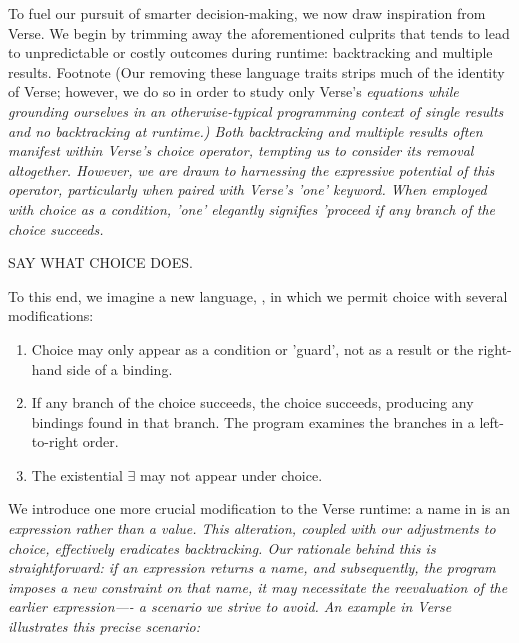 \documentclass[manuscript,screen,review, 12pt]{acmart}
\begin{document}
        
        To fuel our pursuit of smarter decision-making, we now draw inspiration
        from Verse. We begin by trimming away the aforementioned culprits that
        tends to lead to unpredictable or costly outcomes during runtime:
        backtracking and multiple results. Footnote (Our removing these language
        traits strips much of the identity of Verse; however, we do so in order
        to study only Verse's \it{equations} while grounding ourselves in an
        otherwise-typical programming context of single results and no
        backtracking at runtime.) Both backtracking and multiple results often
        manifest within Verse's choice operator, tempting us to consider its
        removal altogether. However, we are drawn to harnessing the expressive
        potential of this operator, particularly when paired with Verse's 'one'
        keyword. When employed with choice as a condition, 'one' elegantly
        signifies 'proceed if any branch of the choice succeeds. 
        
        
        SAY WHAT CHOICE DOES. 

        To this end, we imagine a new language, \VMinus, in which we permit
        choice with several modifications:

        \begin{enumerate}
        \item Choice may only appear as a condition or 'guard', not as a result
        or the right-hand side of a binding.
        \item If any branch of the choice succeeds, the choice succeeds,
        producing any bindings found in that branch. The program examines the
        branches in a left-to-right order.
        \item The existential $\exists$ may not appear under choice.
        \end{enumerate}

        We introduce one more crucial modification to the Verse runtime: a name
        in \VMinus is an \it{expression} rather than a \it{value}. This
        alteration, coupled with our adjustments to choice, effectively
         eradicates backtracking. Our rationale
        behind this is straightforward: if an expression returns a name, and
        subsequently, the program imposes a new constraint on that name, it may
        necessitate the reevaluation of the earlier expression—- a scenario we
        strive to avoid. An example in Verse illustrates this precise scenario:
\end{document}
